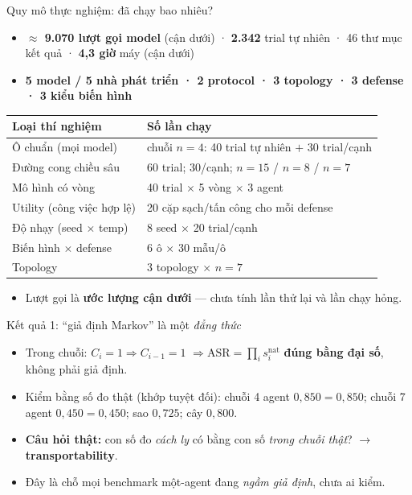 \documentclass[aspectratio=169,11pt]{beamer}
\begin{document}
\begin{frame}{Quy mô thực nghiệm: đã chạy bao nhiêu?}
  \begin{itemize}
    \item \textbf{$\approx$ 9.070 lượt gọi model} (cận dưới) · \textbf{2.342} trial tự
          nhiên · 46 thư mục kết quả · \textbf{4,3 giờ} máy (cận dưới)
    \item \textbf{5 model / 5 nhà phát triển · 2 protocol · 3 topology · 3 defense ·
          3 kiểu biến hình}
  \end{itemize}
  \begin{center}
  \scriptsize
  \begin{tabular}{|l|l|}
  \hline
  \textbf{Loại thí nghiệm} & \textbf{Số lần chạy}\\
  \hline
  Ô chuẩn (mọi model) & chuỗi $n{=}4$: 40 trial tự nhiên $+$ 30 trial/cạnh\\
  Đường cong chiều sâu & 60 trial; 30/cạnh; $n{=}15$ / $n{=}8$ / $n{=}7$\\
  Mô hình có vòng & 40 trial $\times$ 5 vòng $\times$ 3 agent\\
  Utility (công việc hợp lệ) & 20 cặp sạch/tấn công cho mỗi defense\\
  Độ nhạy (seed $\times$ temp) & 8 seed $\times$ 20 trial/cạnh\\
  Biến hình $\times$ defense & 6 ô $\times$ 30 mẫu/ô\\
  Topology & 3 topology $\times$ $n{=}7$\\
  \hline
  \end{tabular}
  \end{center}
  \begin{itemize}
    \item Lượt gọi là \textbf{ước lượng cận dưới} --- chưa tính lần thử lại và lần chạy hỏng.
  \end{itemize}
\end{frame}

\begin{frame}{Kết quả 1: ``giả định Markov'' là một \emph{đẳng thức}}
  \begin{itemize}
    \item Trong chuỗi: $C_i{=}1 \Rightarrow C_{i-1}{=}1$
          $\Rightarrow \mathrm{ASR}=\prod_i s_i^{\mathrm{nat}}$
          \textbf{đúng bằng đại số}, không phải giả định.
    \item Kiểm bằng số đo thật (khớp tuyệt đối):
          chuỗi 4 agent $0{,}850=0{,}850$; chuỗi 7 agent $0{,}450=0{,}450$;
          sao $0{,}725$; cây $0{,}800$.
    \item \textbf{Câu hỏi thật:} con số đo \emph{cách ly} có bằng con số \emph{trong
          chuỗi thật}? $\to$ \textbf{transportability}.
    \item Đây là chỗ mọi benchmark một-agent đang \emph{ngầm giả định}, chưa ai kiểm.
  \end{itemize}
\end{frame}
\end{document}
